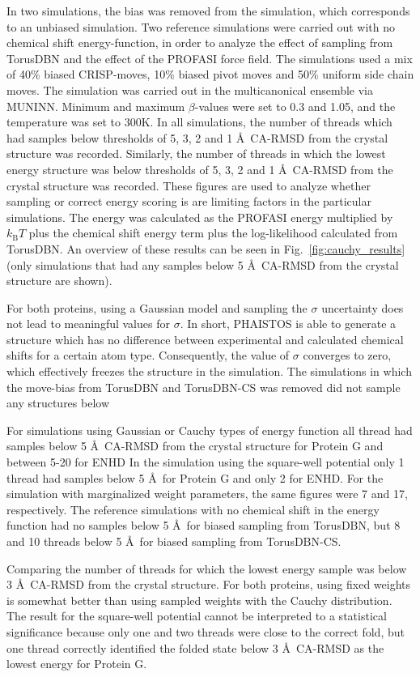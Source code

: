 In two simulations, the bias was removed from the simulation, which corresponds to an unbiased simulation.
Two reference simulations were carried out with no chemical shift energy-function, in order to analyze the effect of sampling from TorusDBN and the effect of the PROFASI force field.
The simulations used a mix of 40\% biased CRISP-moves, 10\% biased pivot moves and 50\% uniform side chain moves.
The simulation was carried out in the multicanonical ensemble via MUNINN.
Minimum and maximum $\beta$-values were set to 0.3 and 1.05, and the temperature was set to 300K.
In all simulations, the number of threads which had samples below thresholds of 5, 3, 2 and 1 \AA~CA-RMSD from the crystal structure was recorded.
Similarly, the number of threads in which the lowest energy structure was below thresholds of 5, 3, 2 and 1 \AA~CA-RMSD from the crystal structure was recorded.
These figures are used to analyze whether sampling or correct energy scoring is are limiting factors in the particular simulations.
The energy was calculated as the PROFASI energy multiplied by $k_{\mathrm{B}}T$ plus the chemical shift energy term plus the log-likelihood calculated from TorusDBN.
An overview of these results can be seen in Fig.~\ref{fig:cauchy_results} (only simulations that had any samples below 5 \AA~CA-RMSD from the crystal structure are shown).

For both proteins, using a Gaussian model and sampling the $\sigma$ uncertainty does not lead to meaningful values for $\sigma$.
In short, PHAISTOS is able to generate a structure which has no difference between experimental and calculated chemical shifts for a certain atom type.
Consequently, the value of $\sigma$ converges to zero, which effectively freezes the structure in the simulation.
The simulations in which the move-bias from TorusDBN and TorusDBN-CS was removed did not sample any structures below 

For simulations using Gaussian or Cauchy types of energy function all thread had samples below 5 \AA~CA-RMSD from the crystal structure for Protein G and between 5-20 for ENHD 
In the simulation using the square-well potential only 1 thread had samples below 5 \AA~for Protein G  and only 2 for ENHD.
For the simulation with marginalized weight parameters, the same figures were 7 and 17, respectively.
The reference simulations with no chemical shift in the energy function had no samples below 5 \AA~for biased sampling from TorusDBN, but 8 and 10 threads below 5 \AA~for biased sampling from TorusDBN-CS.

Comparing the number of threads for which the lowest energy sample was below 3 \AA~CA-RMSD from the crystal structure.
For both proteins, using fixed weights is somewhat better than using sampled weights with the Cauchy distribution.
The result for the square-well potential cannot be interpreted to a statistical significance because only one and two threads were close to the correct fold, but one thread correctly identified the folded state below 3 \AA~CA-RMSD as the lowest energy for Protein G.

